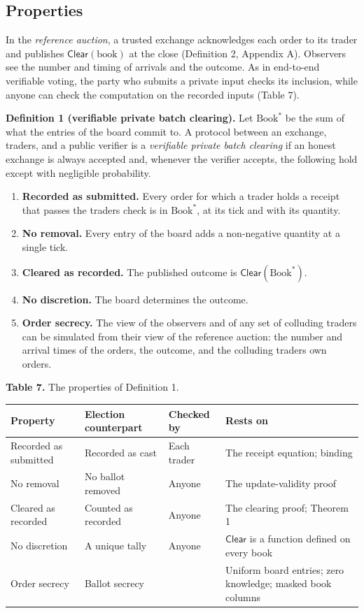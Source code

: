 \subsection{Properties}

In the \emph{reference auction}, a trusted exchange acknowledges each order to its trader and publishes \(\mathsf{Clear}(\text{book})\) at the close (Definition 2, Appendix A). Observers see the number and timing of arrivals and the outcome. As in end-to-end verifiable voting, the party who submits a private input checks its inclusion, while anyone can check the computation on the recorded inputs (Table 7).

\textbf{Definition 1 (verifiable private batch clearing).} Let \(\text{Book}^*\) be the sum of what the entries of the board commit to. A protocol between an exchange, traders, and a public verifier is a \emph{verifiable private batch clearing} if an honest exchange is always accepted and, whenever the verifier accepts, the following hold except with negligible probability.

\begin{enumerate}
\def\labelenumi{\arabic{enumi}.}
\item
  \textbf{Recorded as submitted.} Every order for which a trader holds a receipt that passes the trader\textquotesingle s check is in \(\text{Book}^*\), at its tick and with its quantity.
\item
  \textbf{No removal.} Every entry of the board adds a non-negative quantity at a single tick.
\item
  \textbf{Cleared as recorded.} The published outcome is \(\mathsf{Clear}(\text{Book}^*)\).
\item
  \textbf{No discretion.} The board determines the outcome.
\item
  \textbf{Order secrecy.} The view of the observers and of any set of colluding traders can be simulated from their view of the reference auction: the number and arrival times of the orders, the outcome, and the colluding traders\textquotesingle{} own orders.
\end{enumerate}

\textbf{Table 7.} The properties of Definition 1.

\begin{longtable}[]{@{}llll@{}}
\toprule\noalign{}
Property & Election counterpart \cite{zeeperio2026} & Checked by & Rests on \\
\midrule\noalign{}
\endhead
\bottomrule\noalign{}
\endlastfoot
Recorded as submitted & Recorded as cast & Each trader & The receipt equation; binding \\
No removal & No ballot removed & Anyone & The update-validity proof \\
Cleared as recorded & Counted as recorded & Anyone & The clearing proof; Theorem 1 \\
No discretion & A unique tally & Anyone & \(\mathsf{Clear}\) is a function defined on every book \\
Order secrecy & Ballot secrecy & & Uniform board entries; zero knowledge; masked book columns \\
\end{longtable}

